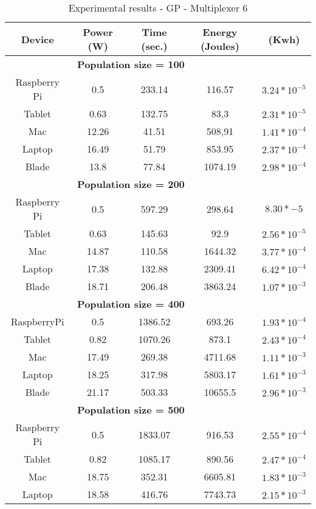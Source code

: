 \begin{small}

\begin{table}[!ht]
\renewcommand{\arraystretch}{1.3}
\centering
\caption{Experimental results - GP - Multiplexer 6}
\label{Table:result_todos}
\begin{tabular}{ccccc} \hline
Device & Power (W) & Time (sec.) & Energy (Joules) & (Kwh) \\ \hline
\multicolumn{4}{c}{\textbf{Population size = 100}}\\ %
Raspberry Pi & 0.5 & 233.14 &116.57 & $3.24*10^{-5}$ \\
Tablet & 0.63 & 132.75 & 83,3 & $2.31*10^{-5}$ \\
Mac & 12.26 & 41.51 & 508,91 & $1.41*10^{-4}$ \\
Laptop & 16.49 & 51.79 & 853.95 & $2.37*10^{-4}$ \\
Blade & 13.8 & 77.84 & 1074.19 & $2.98*10^{-4}$ \\ \hline
\multicolumn{4}{c}{\textbf{Population size = 200}}\\ %
Raspberry Pi & 0.5 & 597.29 & 298.64 & $8.30*{-5}$ \\
Tablet & 0.63 & 145.63 & 92.9 & $2.56*10^{-5}$ \\
Mac & 14.87 & 110.58 & 1644.32 & $3.77*10^{-4}$ \\
Laptop	& 17.38 & 132.88 & 2309.41 & $6.42*10^{-4}$ \\
Blade & 18.71 & 206.48 & 3863.24 & $1.07*10^{-3}$ \\ \hline
\multicolumn{4}{c}{\textbf{Population size = 400}}\\ %
 RaspberryPi & 0.5 & 1386.52 & 693.26 & $1.93*10^{-4}$ \\
Tablet & 0.82 & 1070.26 & 873.1 & $2.43*10^{-4}$\\
Mac&17.49 & 269.38 & 4711.68 & $1.11*10^{-3}$\\
Laptop & 18.25 & 317.98 & 5803.17 & $1.61*10^{-3}$\\
Blade & 21.17 & 503.33 & 10655.5 & $2.96*10^{-3}$ \\ \hline
\multicolumn{4}{c}{\textbf{Population size = 500}}\\ %
Raspberry Pi & 0.5 & 1833.07 & 916.53 & $2.55*10^{-4}$ \\
Tablet & 0.82 & 1085.17 & 890.56 & $2.47*10^{-4}$ \\
Mac & 18.75 & 352.31 & 6605.81 & $1.83*10^{-3}$ \\
Laptop & 18.58 & 416.76 & 7743.73 & $2.15*10^{-3}$ \\

\end{tabular}
\end{table}
\end{small}
